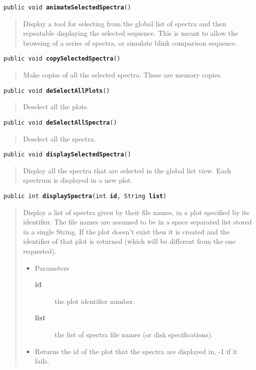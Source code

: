 \documentclass[twoside,11pt,nolof]{starlink}
\providecommand{\method}[1]{\texttt{#1}}
\newenvironment{desc}{\begin{quote}}{\end{quote}}
\begin{document}
\method{public void \textbf{animateSelectedSpectra}()\label{l342}\label{l343}}
\begin{desc}Display a tool for selecting from the global list of spectra
 and then repeatable displaying the selected sequence. This is
 meant to allow the browsing of a series of spectra, or simulate
 blink comparison sequence.
\end{desc}

\method{public void \textbf{copySelectedSpectra}()\label{l344}\label{l345}}
\begin{desc}Make copies of all the selected spectra. These are memory
 copies.
\end{desc}

\method{public void \textbf{deSelectAllPlots}()\label{l346}\label{l347}}
\begin{desc}Deselect all the plots.
\end{desc}

\method{public void \textbf{deSelectAllSpectra}()\label{l348}\label{l349}}
\begin{desc}Deselect all the spectra.
\end{desc}

\method{public void \textbf{displaySelectedSpectra}()\label{l350}\label{l351}}
\begin{desc}Display all the spectra that are selected in the global list
 view. Each spectrum is displayed in a new plot.
\end{desc}

\method{public int \textbf{displaySpectra}(\texttt{int} \textbf{id}, \texttt{String} \textbf{list})\label{l352}\label{l353}}
\begin{desc}Display a list of spectra given by their file names, in a plot
 specified by its identifier. The file names are assumed to be
 in a space separated list stored in a single String. If the
 plot doesn't exist then it is created and the identifier of
 that plot is returned (which will be different from the one
 requested).
\begin{itemize}
\item{Parameters
  \begin{description}
   \item[\textbf{id}]{the plot identifier number.}
   \item[\textbf{list}]{the list of spectra file names (or disk
             specifications).}
  \end{description}}
\end{itemize}
\begin{itemize}
\item{Returns the id of the plot that the spectra are displayed
         in, -1 if it fails. }
\end{itemize}
\end{desc}
\end{document}
